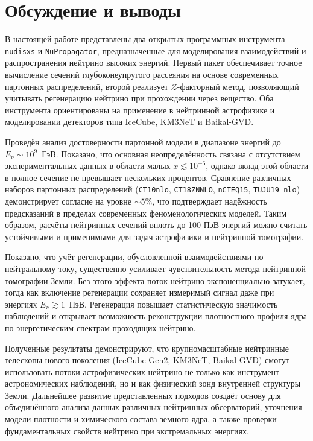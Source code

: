 \section{Обсуждение и выводы}
\label{sec:conclusions}
В настоящей работе представлены два открытых программных инструмента — \texttt{nudisxs} и \texttt{NuPropagator}, предназначенные для моделирования взаимодействий и распространения нейтрино высоких энергий. 
Первый пакет обеспечивает точное вычисление сечений глубоконеупругого рассеяния на основе современных партонных распределений, 
второй реализует $\mathcal{Z}$-факторный метод, позволяющий учитывать регенерацию нейтрино при прохождении через вещество. 
Оба инструмента ориентированы на применение в нейтринной астрофизике и моделировании детекторов типа IceCube, KM3NeT и Baikal-GVD.

Проведён анализ достоверности партонной модели в диапазоне энергий до $E_\nu \sim 10^9$~ГэВ. 
Показано, что основная неопределённость связана с отсутствием экспериментальных данных в области малых $x \lesssim 10^{-6}$, однако вклад этой области в полное сечение не превышает нескольких процентов. 
Сравнение различных наборов партонных распределений (\texttt{CT10nlo}, \texttt{CT18ZNNLO}, \texttt{nCTEQ15}, \texttt{TUJU19\_nlo}) демонстрирует согласие на уровне $\sim5\%$, что подтверждает надёжность предсказаний в пределах современных феноменологических моделей. 
Таким образом, расчёты нейтринных сечений вплоть до 100 ПэВ энергий можно считать устойчивыми и применимыми для задач астрофизики и нейтринной томографии.

Показано, что учёт регенерации, обусловленной взаимодействиями по нейтральному току, существенно усиливает чувствительность метода нейтринной томографии Земли. 
Без этого эффекта поток нейтрино экспоненциально затухает, тогда как включение регенерации сохраняет измеримый сигнал даже при энергиях $E_\nu \gtrsim 1$~ПэВ. 
Регенерация повышает статистическую значимость наблюдений и открывает возможность реконструкции плотностного профиля ядра по энергетическим спектрам проходящих нейтрино.

Полученные результаты демонстрируют, что крупномасштабные нейтринные телескопы нового поколения (IceCube-Gen2, KM3NeT, Baikal-GVD) смогут использовать потоки астрофизических нейтрино не только как инструмент астрономических наблюдений, но и как физический зонд внутренней структуры Земли. 
Дальнейшее развитие представленных подходов создаёт основу для объединённого анализа данных различных нейтринных обсерваторий, уточнения модели плотности и химического состава земного ядра, а также проверки фундаментальных свойств нейтрино при экстремальных энергиях.
